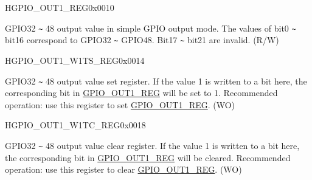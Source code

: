 \begin{register}{H}{GPIO\_OUT1\_REG}{0x{}0010}\label{regdesc:GPIOOUT1REG}
%
%
\regnewline%
\begin{regdesc}\begin{reglist}
\label{fielddesc:GPIOOUT1DATAORIG}\item [GPIO\_OUT1\_DATA\_ORIG] GPIO32 \verb+~+ 48 output value in simple GPIO output mode. The values of bit0 \verb+~+ bit16 correspond to GPIO32 \verb+~+ GPIO48. Bit17 \verb+~+ bit21 are invalid. (R/W)
\end{reglist}\end{regdesc}
\end{register}


\begin{register}{H}{GPIO\_OUT1\_W1TS\_REG}{0x{}0014}\label{regdesc:GPIOOUT1W1TSREG}
%
%
\regnewline%
\begin{regdesc}\begin{reglist}
\label{fielddesc:GPIOOUT1W1TS}\item [GPIO\_OUT1\_W1TS] GPIO32 \verb+~+ 48 output value set register. If the value 1 is written to a bit here, the corresponding bit in \hyperref[regdesc:GPIOOUT1REG]{GPIO\_OUT1\_REG} will be set to 1. Recommended operation: use this register to set \hyperref[regdesc:GPIOOUT1REG]{GPIO\_OUT1\_REG}. (WO)
\end{reglist}\end{regdesc}
\end{register}


\begin{register}{H}{GPIO\_OUT1\_W1TC\_REG}{0x{}0018}\label{regdesc:GPIOOUT1W1TCREG}
%
%
\regnewline%
\begin{regdesc}\begin{reglist}
\label{fielddesc:GPIOOUT1W1TC}\item [GPIO\_OUT1\_W1TC] GPIO32 \verb+~+ 48 output value clear register. If the value 1 is written to a bit here, the corresponding bit in \hyperref[regdesc:GPIOOUT1REG]{GPIO\_OUT1\_REG} will be cleared. Recommended operation: use this register to clear \hyperref[regdesc:GPIOOUT1REG]{GPIO\_OUT1\_REG}. (WO)
\end{reglist}\end{regdesc}
\end{register}


